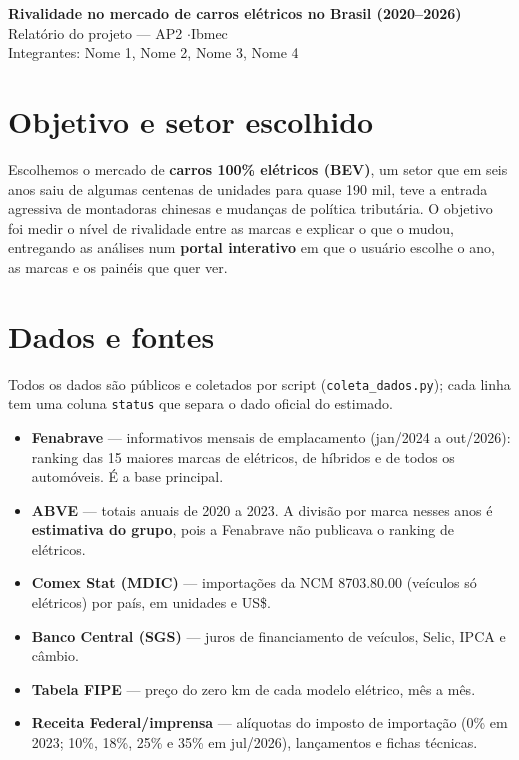 \documentclass[10pt,a4paper]{article}
\begin{document}
\begin{center}
{\Large\bfseries Rivalidade no mercado de carros elétricos no Brasil (2020--2026)}\\[3pt]
Relatório do projeto --- AP2 \quad$\cdot$\quad Ibmec\\[2pt]
\small Integrantes: Nome 1, Nome 2, Nome 3, Nome 4
\end{center}

\section{Objetivo e setor escolhido}
Escolhemos o mercado de \textbf{carros 100\% elétricos (BEV)}, um setor que em seis anos saiu de algumas centenas de unidades para quase 190 mil, teve a entrada agressiva de montadoras chinesas e mudanças de política tributária. O objetivo foi medir o nível de rivalidade entre as marcas e explicar o que o mudou, entregando as análises num \textbf{portal interativo} em que o usuário escolhe o ano, as marcas e os painéis que quer ver.

\section{Dados e fontes}
Todos os dados são públicos e coletados por script (\texttt{coleta\_dados.py}); cada linha tem uma coluna \texttt{status} que separa o dado oficial do estimado.
\begin{itemize}
  \item \textbf{Fenabrave} --- informativos mensais de emplacamento (jan/2024 a out/2026): ranking das 15 maiores marcas de elétricos, de híbridos e de todos os automóveis. É a base principal.
  \item \textbf{ABVE} --- totais anuais de 2020 a 2023. A divisão por marca nesses anos é \textbf{estimativa do grupo}, pois a Fenabrave não publicava o ranking de elétricos.
  \item \textbf{Comex Stat (MDIC)} --- importações da NCM 8703.80.00 (veículos só elétricos) por país, em unidades e US\$.
  \item \textbf{Banco Central (SGS)} --- juros de financiamento de veículos, Selic, IPCA e câmbio.
  \item \textbf{Tabela FIPE} --- preço do zero km de cada modelo elétrico, mês a mês.
  \item \textbf{Receita Federal/imprensa} --- alíquotas do imposto de importação (0\% em 2023; 10\%, 18\%, 25\% e 35\% em jul/2026), lançamentos e fichas técnicas.
\end{itemize}
\end{document}

